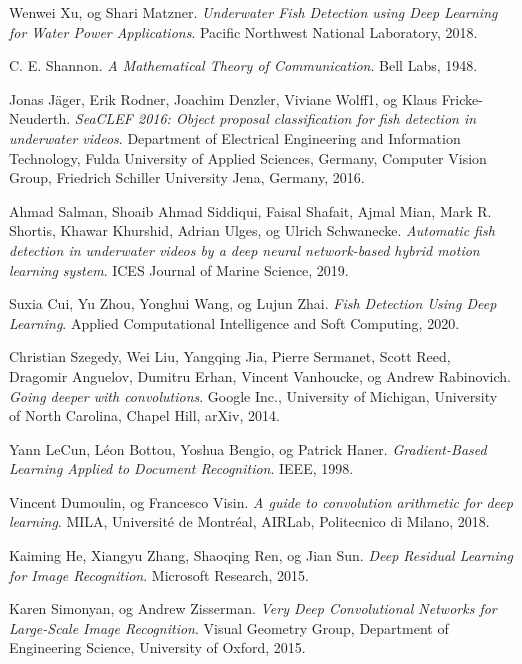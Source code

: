 \documentclass[11ot]{article}
\begin{document}
\begin{thebibliography}{9}
Wenwei Xu, og Shari Matzner. 
\textit{Underwater Fish Detection using Deep Learning for Water Power Applications}. 
Pacific Northwest National Laboratory, 2018.

C. E. Shannon. 
\textit{A Mathematical Theory of Communication}. 
Bell Labs, 1948.

Jonas Jäger, Erik Rodner, Joachim Denzler, Viviane Wolff1, og Klaus Fricke-Neuderth. 
\textit{SeaCLEF 2016: Object proposal classification for fish detection in underwater videos}. 
Department of Electrical Engineering and Information Technology, Fulda University of Applied Sciences, Germany, Computer Vision Group, Friedrich Schiller University Jena, Germany, 2016.

Ahmad Salman, Shoaib Ahmad Siddiqui, Faisal Shafait, Ajmal Mian, Mark R. Shortis, Khawar Khurshid, Adrian Ulges, og Ulrich Schwanecke. 
\textit{Automatic fish detection in underwater videos by a deep neural network-based hybrid motion learning system}. 
ICES Journal of Marine Science, 2019.

Suxia Cui, Yu Zhou, Yonghui Wang, og Lujun Zhai. 
\textit{Fish Detection Using Deep Learning}. 
Applied Computational Intelligence and Soft Computing, 2020.

Christian Szegedy, Wei Liu, Yangqing Jia, Pierre Sermanet, Scott Reed, Dragomir Anguelov, Dumitru Erhan, Vincent Vanhoucke, og Andrew Rabinovich. 
\textit{Going deeper with convolutions}. 
Google Inc., University of Michigan, University of North Carolina, Chapel Hill, arXiv, 2014.

Yann LeCun, Léon Bottou, Yoshua Bengio, og Patrick Haner. 
\textit{Gradient-Based Learning Applied to Document Recognition}. 
IEEE, 1998.

Vincent Dumoulin, og Francesco Visin. 
\textit{A guide to convolution arithmetic for deep learning}. 
MILA, Université de Montréal, AIRLab, Politecnico di Milano, 2018.

Kaiming He, Xiangyu Zhang, Shaoqing Ren, og Jian Sun. 
\textit{Deep Residual Learning for Image Recognition}. 
Microsoft Research, 2015.

Karen Simonyan, og Andrew Zisserman. 
\textit{Very Deep Convolutional Networks for Large-Scale Image Recognition}. 
Visual Geometry Group, Department of Engineering Science, University of Oxford, 2015.


\end{thebibliography}
\end{document}
